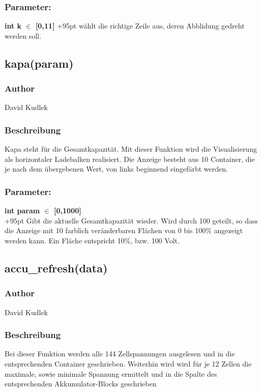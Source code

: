 \documentclass[fontsize = 12pt, paper = a4]{scrreprt}
\begin{document}
\subsubsection*{Parameter:}
\textbf{int k $\in$ [0,11]} 
\hspace{3,5mm}
\hangindent+95pt 
wählt die richtige Zeile aus, deren Abblidung gedreht werden soll.\\


\subsection*{kapa(param)}
\subsubsection*{Author}
David Kudlek
\subsubsection*{Beschreibung}
Kapa steht für die Gesamtkapazität. Mit dieser Funktion wird die Visualisierung als horizontaler Ladebalken realisiert. Die Anzeige besteht aus 10 Container, die je nach dem übergebenen Wert, von links beginnend eingefärbt werden. 
\subsubsection*{Parameter:}
\textbf{int param $\in$ [0,1000]} \\
\hangindent+95pt 
Gibt die aktuelle Gesamtkapazität wieder. Wird durch 100 geteilt, so dass die Anzeige mit 10 farblich veränderbaren Flächen von 0 bis 100\% angezeigt werden kann. Ein Fläche entspricht 10\%, bzw. 100 Volt. \\



\subsection*{accu\_refresh(data)}
\subsubsection*{Author}
David Kudlek
\subsubsection*{Beschreibung}
Bei dieser Funktion werden alle 144 Zellspannungen ausgelesen und in die entsprechenden Container geschrieben. Weiterhin wird wird für je 12 Zellen die maximale, sowie minimale Spannung ermittelt und in die Spalte des entsprechenden Akkumulator-Blocks geschrieben
\end{document}

